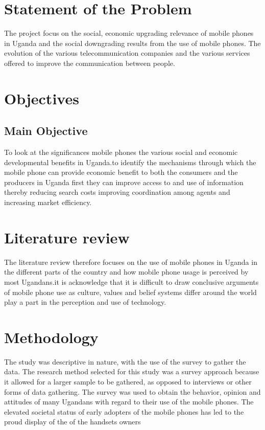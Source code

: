 \documentclass[12]{article}
\begin{document}
\section{Statement of the Problem}
The project focus on the social, economic upgrading relevance of mobile phones in Uganda and the social downgrading results from the use of mobile phones. The evolution of the various telecommunication companies and the various services offered to improve the communication between people.

\section{Objectives}

\subsection{Main Objective}
To look at the significances mobile phones the various social and economic developmental benefits in Uganda.to identify the mechanisms through which the mobile phone can provide economic benefit to both the consumers and the producers in Uganda first they can improve access to and use of information thereby reducing search costs improving coordination among agents and increasing market efficiency.

\section{Literature review}
The literature review therefore focuses on the use of mobile phones in Uganda in the different parts of the country and how mobile phone usage is perceived by most Ugandans.it is acknowledge that it is difficult to draw conclusive arguments of mobile phone use as culture, values and belief systems differ around the world play a part in the perception and use of technology.

\section{Methodology}
The study was descriptive in nature, with the use of the survey to gather the data. The research method selected for this study was a survey approach because it allowed for a larger sample to be gathered, as opposed to interviews or other forms of data gathering. The survey was used to obtain the behavior, opinion and attitudes of many Ugandans with regard to their use of the mobile phones.
The elevated societal status of early adopters of the mobile phones has led to the proud display of the of the handsets owners
\end{document}
